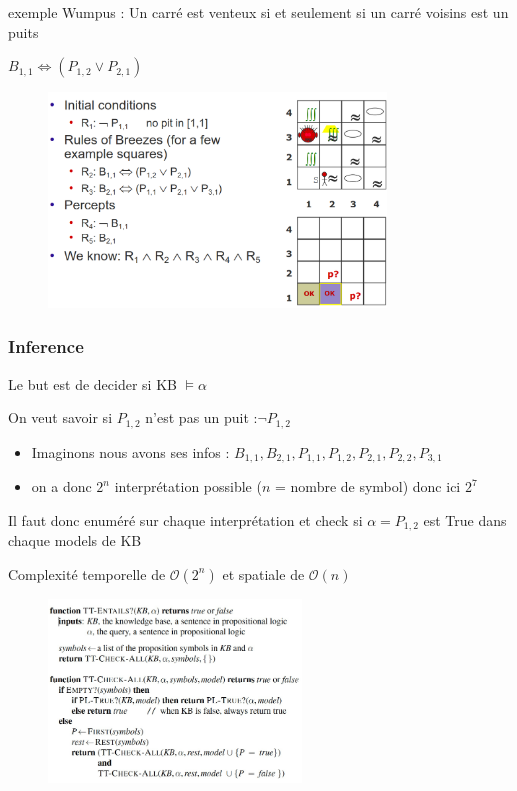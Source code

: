 			exemple Wumpus : Un carré est venteux si et seulement si un carré voisins est un puits
			
			$B_{1,1} \Leftrightarrow (P_{1,2} \vee P_{2,1})$
			
			\begin{figure}[htp]	
			\centering
			\includegraphics[width=0.8\textwidth]{img/KB.png}
		\end{figure}			
		\subsubsection{Inference}
			Le but est de decider si KB $\models \alpha$
			
			On veut savoir si $P_{1,2}$ n'est pas un puit :$\neg P_{1,2}$
			\begin{itemize}
				\item Imaginons nous avons ses infos : $B_{1,1}, B_{2,1}, P_{1,1}, P_{1,2}, P_{2,1}, P_{2,2}, P_{3,1}$
				\item on a donc $2^n$ interprétation possible ($n$ = nombre de symbol) donc ici $2^7$
			\end{itemize}
			
			Il faut donc enuméré sur chaque interprétation et check si $\alpha = P_{1,2}$ est True dans chaque models de KB
			
			Complexité temporelle de $\mathcal{O}(2^n)$ et spatiale de $\mathcal{O}(n)$
			
			\begin{figure}[htp]	
				\centering
				\includegraphics[width=0.6\textwidth]{img/KBA5.png}
			\end{figure}
			
